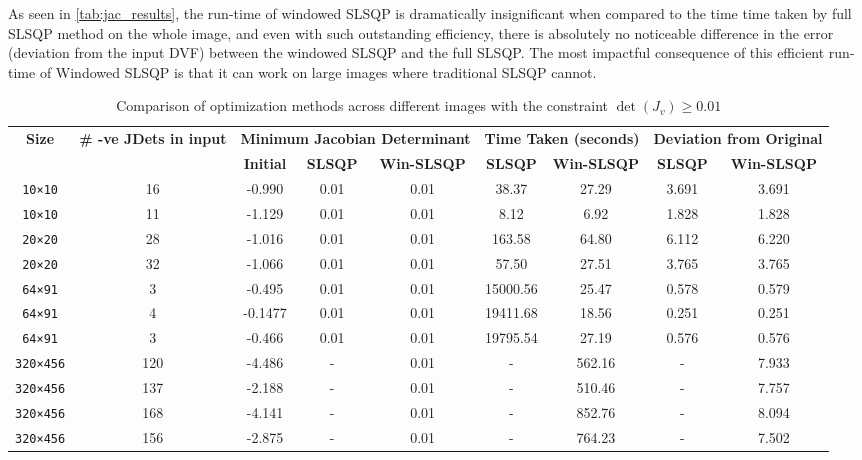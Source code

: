 \documentclass[lettersize,journal]{IEEEtran}
\begin{document}
As seen in \autoref{tab:jac_results}, the run-time of windowed SLSQP is dramatically insignificant when compared to the time time taken by full SLSQP method on the whole image, and even with such outstanding efficiency, there is absolutely no noticeable difference in the error (deviation from the input DVF) between the windowed SLSQP and the full SLSQP. The most impactful consequence of this efficient run-time of Windowed SLSQP is that it can work on large images where traditional SLSQP cannot.

\begin{table}[ht]
\centering
\caption{Comparison of optimization methods across different images with the constraint $\det(J_v)\geq 0.01$}
\label{tab:jac_results}
\renewcommand{\arraystretch}{1.2}
\begin{tabular}{|c|c|ccc|cc|cc|}
\hline
\textbf{Size} & 
\textbf{\# -ve JDets in input} & 
\multicolumn{3}{c|}{\textbf{Minimum Jacobian Determinant}} &
\multicolumn{2}{c|}{\textbf{Time Taken (seconds)}} & 
\multicolumn{2}{c|}{\textbf{Deviation from Original}} \\
\cline{3-9}
 &  & \textbf{Initial} &
\textbf{SLSQP} & \textbf{Win-SLSQP} &
\textbf{SLSQP} & \textbf{Win-SLSQP} &
\textbf{SLSQP} & \textbf{Win-SLSQP} \\
\hline


\texttt{10×10} & 16 & -0.990 & 0.01 & 0.01 & 38.37 & 27.29 & 3.691 & 3.691 \\   %
\texttt{10×10} & 11 & -1.129 & 0.01 & 0.01 & 8.12 & 6.92   & 1.828 & 1.828 \\   %
\texttt{20×20} & 28 & -1.016 & 0.01 & 0.01 & 163.58 & 64.80 & 6.112 & 6.220 \\  %
\texttt{20×20} & 32 & -1.066 & 0.01 & 0.01 & 57.50 & 27.51 & 3.765 & 3.765 \\      %
\texttt{64×91} & 3 & -0.495 & 0.01 & 0.01 & 15000.56 & 25.47 & 0.578 & 0.579 \\  %
\texttt{64×91} & 4 & -0.1477 & 0.01 &0.01 & 19411.68 & 18.56 & 0.251 & 0.251 \\  %
\texttt{64×91} & 3 & -0.466 & 0.01 & 0.01 & 19795.54 & 27.19 & 0.576 & 0.576 \\ %
\texttt{320×456} & 120 & -4.486 & -  & 0.01 & - & 562.16 & - & 7.933  \\  %
\texttt{320×456} & 137 & -2.188 & - & 0.01 & - & 510.46 & - & 7.757  \\  %
\texttt{320×456} & 168 & -4.141 & -  & 0.01 & - & 852.76 & - & 8.094  \\  %
\texttt{320×456} & 156 & -2.875 & - & 0.01 & - &  764.23 & - & 7.502  \\  %

\hline
\end{tabular}
\end{table}
\end{document}
